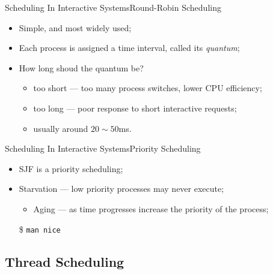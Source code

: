 \begin{frame}{Scheduling In Interactive Systems}{Round-Robin
    Scheduling}
  \begin{center}
  \end{center}
  \begin{itemize}
  \item Simple, and most widely used;
  \item Each process is assigned a time interval, called its \emph{quantum};
  \item How long shoud the quantum be?
    \begin{itemize}
    \item too short --- too many process switches, lower CPU efficiency;
    \item too long --- poor response to short interactive requests;
    \item usually around $20\sim{}50$ms.
    \end{itemize}
  \end{itemize}
\end{frame}

\begin{frame}{Scheduling In Interactive Systems}{Priority Scheduling}
  \begin{center}
  \end{center}
  \begin{itemize}
  \item SJF is a priority scheduling;
  \item \alert{Starvation} --- low priority processes may never execute;
    \begin{itemize}
    \item \alert{Aging} --- as time progresses increase the priority of the process;
    \end{itemize}
  \item[\$] \texttt{man nice}
  \end{itemize}  
\end{frame}

\subsection{Thread Scheduling}
\label{sec:thread-scheduling}

